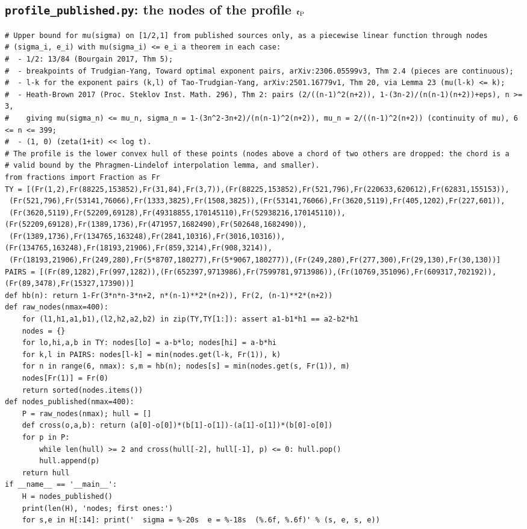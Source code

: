 \documentclass[11pt,reqno]{amsart}
\numberwithin{equation}{section}
\theoremstyle{definition}
\theoremstyle{remark}
\begin{document}
\subsection*{\texttt{profile\_published.py}: the nodes of the profile $\mathfrak e_{\rm P}$}
\label{app:profile}
\begin{lstlisting}
# Upper bound for mu(sigma) on [1/2,1] from published sources only, as a piecewise linear function through nodes
# (sigma_i, e_i) with mu(sigma_i) <= e_i a theorem in each case:
#  - 1/2: 13/84 (Bourgain 2017, Thm 5);
#  - breakpoints of Trudgian-Yang, Toward optimal exponent pairs, arXiv:2306.05599v3, Thm 2.4 (pieces are continuous);
#  - l-k for the exponent pairs (k,l) of Tao-Trudgian-Yang, arXiv:2501.16779v1, Thm 20, via Lemma 23 (mu(l-k) <= k);
#  - Heath-Brown 2017 (Proc. Steklov Inst. Math. 296), Thm 2: pairs (2/((n-1)^2(n+2)), 1-(3n-2)/(n(n-1)(n+2))+eps), n >= 3,
#    giving mu(sigma_n) <= mu_n, sigma_n = 1-(3n^2-3n+2)/(n(n-1)^2(n+2)), mu_n = 2/((n-1)^2(n+2)) (continuity of mu), 6 <= n <= 399;
#  - (1, 0) (zeta(1+it) << log t).
# The profile is the lower convex hull of these points (nodes above a chord of two others are dropped: the chord is a
# valid bound by the Phragmen-Lindelof interpolation lemma, and smaller).
from fractions import Fraction as Fr
TY = [(Fr(1,2),Fr(88225,153852),Fr(31,84),Fr(3,7)),(Fr(88225,153852),Fr(521,796),Fr(220633,620612),Fr(62831,155153)),
 (Fr(521,796),Fr(53141,76066),Fr(1333,3825),Fr(1508,3825)),(Fr(53141,76066),Fr(3620,5119),Fr(405,1202),Fr(227,601)),
 (Fr(3620,5119),Fr(52209,69128),Fr(49318855,170145110),Fr(52938216,170145110)),(Fr(52209,69128),Fr(1389,1736),Fr(471957,1682490),Fr(502648,1682490)),
 (Fr(1389,1736),Fr(134765,163248),Fr(2841,10316),Fr(3016,10316)),(Fr(134765,163248),Fr(18193,21906),Fr(859,3214),Fr(908,3214)),
 (Fr(18193,21906),Fr(249,280),Fr(5*8707,180277),Fr(5*9067,180277)),(Fr(249,280),Fr(277,300),Fr(29,130),Fr(30,130))]
PAIRS = [(Fr(89,1282),Fr(997,1282)),(Fr(652397,9713986),Fr(7599781,9713986)),(Fr(10769,351096),Fr(609317,702192)),(Fr(89,3478),Fr(15327,17390))]
def hb(n): return 1-Fr(3*n*n-3*n+2, n*(n-1)**2*(n+2)), Fr(2, (n-1)**2*(n+2))
def raw_nodes(nmax=400):
    for (l1,h1,a1,b1),(l2,h2,a2,b2) in zip(TY,TY[1:]): assert a1-b1*h1 == a2-b2*h1
    nodes = {}
    for lo,hi,a,b in TY: nodes[lo] = a-b*lo; nodes[hi] = a-b*hi
    for k,l in PAIRS: nodes[l-k] = min(nodes.get(l-k, Fr(1)), k)
    for n in range(6, nmax): s,m = hb(n); nodes[s] = min(nodes.get(s, Fr(1)), m)
    nodes[Fr(1)] = Fr(0)
    return sorted(nodes.items())
def nodes_published(nmax=400):
    P = raw_nodes(nmax); hull = []
    def cross(o,a,b): return (a[0]-o[0])*(b[1]-o[1])-(a[1]-o[1])*(b[0]-o[0])
    for p in P:
        while len(hull) >= 2 and cross(hull[-2], hull[-1], p) <= 0: hull.pop()
        hull.append(p)
    return hull
if __name__ == '__main__':
    H = nodes_published()
    print(len(H), 'nodes; first ones:')
    for s,e in H[:14]: print('  sigma = %-20s  e = %-18s  (%.6f, %.6f)' % (s, e, s, e))
\end{lstlisting}
\end{document}
